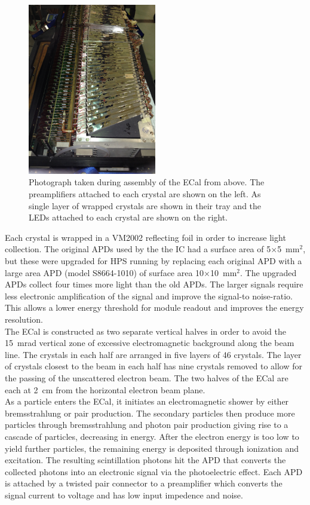 \begin{figure}[h]
  \centering
      \includegraphics[width=0.5\textwidth]{pics/experiment/ecalAssembly1.png}
  \caption[Photograph of ECal crystals during assembly]{Photograph taken during assembly of the ECal from above. The preamplifiers attached to each crystal are shown on the left. As single layer of wrapped crystals are shown in their tray and the LEDs attached to each crystal are shown on the right.}
  \label{Figure:ecalAssembly1}
\end{figure}

Each crystal is wrapped in a VM2002 reflecting foil in order to increase light collection. The original APDs used by the the IC had a surface area of 5$\times$5~mm$^2$, but these were upgraded for HPS running by replacing each original APD with a large area APD (model S8664-1010) of surface area 10$\times$10~mm$^2$. The upgraded APDs collect four times more light than the old APDs. The larger signals require less electronic amplification of the signal and improve the signal-to noise-ratio. This allows a lower energy threshold for module readout and improves the energy resolution. \\
\indent The ECal is constructed as two separate vertical halves in order to avoid the 15~mrad vertical zone of excessive electromagnetic background along the beam line. The crystals in each half are arranged in five layers of 46 crystals. The layer of crystals closest to the beam in each half has nine crystals removed to allow for the passing of the unscattered electron beam. The two halves of the ECal are each at 2~cm from the  horizontal electron beam plane.\\
\indent As a particle enters the ECal, it initiates an electromagnetic shower by either bremsstrahlung or pair production. The secondary particles then produce more particles through bremsstrahlung and photon pair production giving rise to a cascade of particles, decreasing in energy. After the electron energy is too low to yield further particles, the remaining energy is deposited through ionization and excitation. The resulting scintillation photons hit the APD that converts the collected photons into an electronic signal via the photoelectric effect. Each APD is attached by a twisted pair connector to a preamplifier which converts the signal current to voltage and has low input impedence and noise.  



